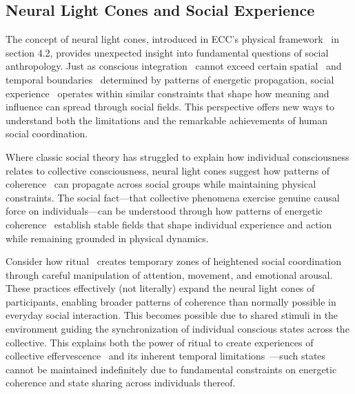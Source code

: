 \subsection*{Neural Light Cones and Social Experience}

The concept of neural light cones, introduced in ECC's physical framework~ in section 4.2, provides unexpected insight into fundamental questions of social anthropology. Just as conscious integration~ cannot exceed certain spatial~ and temporal boundaries~ determined by patterns of energetic propagation, social experience~ operates within similar constraints that shape how meaning and influence can spread through social fields. This perspective offers new ways to understand both the limitations and the remarkable achievements of human social coordination.

Where classic social theory has struggled to explain how individual consciousness relates to collective consciousness, neural light cones suggest how patterns of coherence~ can propagate across social groups while maintaining physical constraints. The social fact—that collective phenomena exercise genuine causal force on individuals—can be understood through how patterns of energetic coherence~ establish stable fields that shape individual experience and action while remaining grounded in physical dynamics.

Consider how ritual~ creates temporary zones of heightened social coordination through careful manipulation of attention, movement, and emotional arousal. These practices effectively (not literally) expand the neural light cones of participants, enabling broader patterns of coherence than normally possible in everyday social interaction. This becomes possible due to shared stimuli in the environment guiding the synchronization of individual conscious states across the collective. This explains both the power of ritual to create experiences of collective effervescence~ and its inherent temporal limitations~—such states cannot be maintained indefinitely due to fundamental constraints on energetic coherence and state sharing across individuals thereof.


